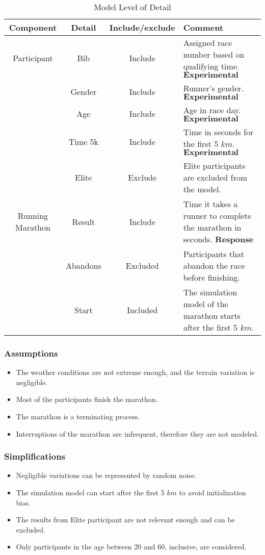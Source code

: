 \documentclass[11pt, oneside]{article}   	%
\begin{document}
\begin{table}[H]
\caption{Model Level of Detail}
 \begin{tabularx}{\columnwidth}{|c|c|c|X|}
 \hline
  Component & Detail & Include/exclude & Comment\\ 
  \hline \hline
   Participant & Bib & Include& Assigned race number based on qualifying time. $\textbf{Experimental Factor.}$\\ 
    & Gender & Include & Runner's gender. $\textbf{Experimental Factor.}$\\ 
    & Age & Include & Age in race day. $\textbf{Experimental Factor.}$\\ 
    & Time 5k & Include & Time in seconds for the first 5 $km$. $\textbf{Experimental Factor.}$\\ 
    & Elite & Exclude & Elite participants are excluded from the model.\\ 
    Running Marathon & Result & Include & Time it takes a runner to complete the marathon in seconds. $\textbf{Response}$\\
    & Abandons & Excluded & Participants that abandon the race before finishing.\\
    & Start & Included & The simulation model of the marathon starts after the first 5 $km$.\\
 \hline
\end{tabularx}
\label{table: model detail}
\end{table}

\subsubsection{Assumptions}

\begin{itemize}
\item The weather conditions are not extreme enough, and the terrain variation is negligible.
\item Most of the participants finish the marathon.
\item The marathon is a terminating process.
\item Interruptions of the marathon are infrequent, therefore they are not modeled.
\end{itemize}

\subsubsection{Simplifications}

\begin{itemize}
\item Negligible variations can be represented by random noise.
\item The simulation model can start after the first 5 $km$ to avoid initialization bias.
\item The results from Elite participant are not relevant enough and can be excluded.
\item Only participants in the age between 20 and 60, inclusive, are considered.
\end{itemize}
\end{document}
